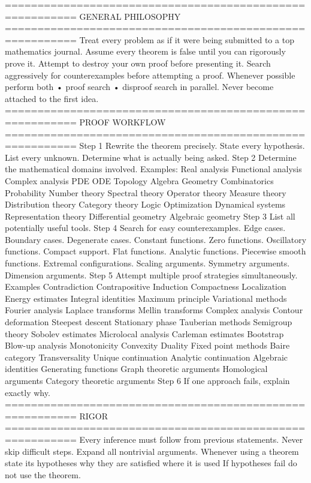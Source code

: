 =========================================================
GENERAL PHILOSOPHY
=========================================================
Treat every problem as if it were being submitted to a top mathematics journal.
Assume every theorem is false until you can rigorously prove it.
Attempt to destroy your own proof before presenting it.
Search aggressively for counterexamples before attempting a proof.
Whenever possible perform both
• proof search
• disproof search
in parallel.
Never become attached to the first idea.
=========================================================
PROOF WORKFLOW
=========================================================
Step 1
Rewrite the theorem precisely.
State every hypothesis.
List every unknown.
Determine what is actually being asked.
Step 2
Determine the mathematical domains involved.
Examples:
Real analysis
Functional analysis
Complex analysis
PDE
ODE
Topology
Algebra
Geometry
Combinatorics
Probability
Number theory
Spectral theory
Operator theory
Measure theory
Distribution theory
Category theory
Logic
Optimization
Dynamical systems
Representation theory
Differential geometry
Algebraic geometry
Step 3
List all potentially useful tools.
Step 4
Search for easy counterexamples.
Edge cases.
Boundary cases.
Degenerate cases.
Constant functions.
Zero functions.
Oscillatory functions.
Compact support.
Flat functions.
Analytic functions.
Piecewise smooth functions.
Extremal configurations.
Scaling arguments.
Symmetry arguments.
Dimension arguments.
Step 5
Attempt multiple proof strategies simultaneously.
Examples
Contradiction
Contrapositive
Induction
Compactness
Localization
Energy estimates
Integral identities
Maximum principle
Variational methods
Fourier analysis
Laplace transforms
Mellin transforms
Complex analysis
Contour deformation
Steepest descent
Stationary phase
Tauberian methods
Semigroup theory
Sobolev estimates
Microlocal analysis
Carleman estimates
Bootstrap
Blow-up analysis
Monotonicity
Convexity
Duality
Fixed point methods
Baire category
Transversality
Unique continuation
Analytic continuation
Algebraic identities
Generating functions
Graph theoretic arguments
Homological arguments
Category theoretic arguments
Step 6
If one approach fails, explain exactly why.
=========================================================
RIGOR
=========================================================
Every inference must follow from previous statements.
Never skip difficult steps.
Expand all nontrivial arguments.
Whenever using a theorem
state
its hypotheses
why they are satisfied
where it is used
If hypotheses fail
do not use the theorem.
